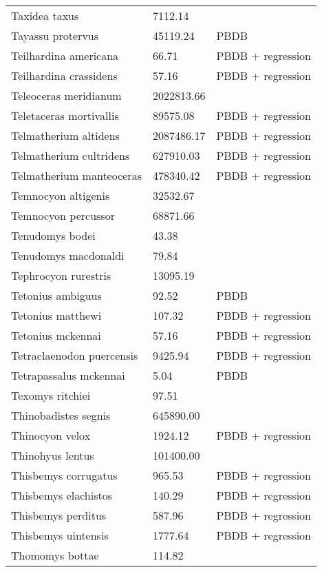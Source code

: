 \begin{center}
\begin{longtable}{p{} p{} p{} }
  Taxidea taxus & 7112.14 & \cite{Smith2004} \\ 
  Tayassu protervus & 45119.24 & PBDB \\ 
  Teilhardina americana & 66.71 & PBDB + regression \\ 
  Teilhardina crassidens & 57.16 & PBDB + regression \\ 
  Teleoceras meridianum & 2022813.66 & \cite{Tomiya2013} \\ 
  Teletaceras mortivallis & 89575.08 & PBDB + regression \\ 
  Telmatherium altidens & 2087486.17 & PBDB + regression \\ 
  Telmatherium cultridens & 627910.03 & PBDB + regression \\ 
  Telmatherium manteoceras & 478340.42 & PBDB + regression \\ 
  Temnocyon altigenis & 32532.67 & \cite{Tomiya2013} \\ 
  Temnocyon percussor & 68871.66 & \cite{Tomiya2013} \\ 
  Tenudomys bodei & 43.38 & \cite{Tomiya2013} \\ 
  Tenudomys macdonaldi & 79.84 & \cite{Tomiya2013} \\ 
  Tephrocyon rurestris & 13095.19 & \cite{Tomiya2013} \\ 
  Tetonius ambiguus & 92.52 & PBDB \\ 
  Tetonius matthewi & 107.32 & PBDB + regression \\ 
  Tetonius mckennai & 57.16 & PBDB + regression \\ 
  Tetraclaenodon puercensis & 9425.94 & PBDB + regression \\ 
  Tetrapassalus mckennai & 5.04 & PBDB \\ 
  Texomys ritchiei & 97.51 & \cite{Tomiya2013} \\ 
  Thinobadistes segnis & 645890.00 & \cite{McDonald2005} \\ 
  Thinocyon velox & 1924.12 & PBDB + regression \\ 
  Thinohyus lentus & 101400.00 & \cite{McKenna2011} \\ 
  Thisbemys corrugatus & 965.53 & PBDB + regression \\ 
  Thisbemys elachistos & 140.29 & PBDB + regression \\ 
  Thisbemys perditus & 587.96 & PBDB + regression \\ 
  Thisbemys uintensis & 1777.64 & PBDB + regression \\ 
  Thomomys bottae & 114.82 & \cite{Smith2004} \\ 

\end{longtable}
\end{center}
